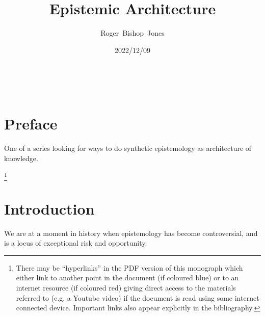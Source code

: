 \documentclass[10pt,titlepage]{article}
\title{\LARGE\bf Epistemic Architecture}
\author{Roger~Bishop~Jones}
\date{\small 2022/12/09}
\newcommand{\ignore}[1]{}
\begin{document}
                               
\begin{titlepage}
\maketitle





\end{titlepage}

\ \

\ignore{
\begin{centering}
{}
\end{centering}
}%

\setcounter{tocdepth}{2}
{\parskip-0pt\tableofcontents}


\pagebreak

\section*{Preface}


One of a series looking for ways to do synthetic epistemology as architecture of knowledge.

\footnote{There may be ``hyperlinks'' in the PDF version of this monograph which either link to another point in the document  (if coloured blue) or to an internet resource  (if coloured red) giving direct access to the materials referred to (e.g. a Youtube video) if the document is read using some internet connected device.
Important links also appear explicitly in the bibliography.}

\section{Introduction}

We are at a moment in history when epistemology has become controversial, and is a locus of exceptional risk and opportunity.
\end{document}
